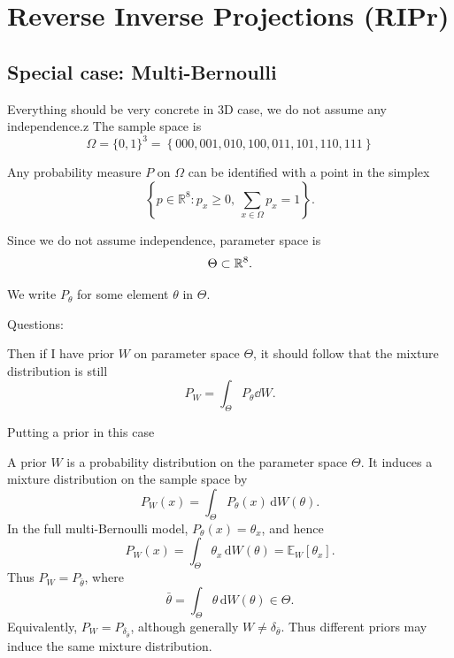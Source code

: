 \clearpage

\section{Reverse Inverse Projections (RIPr)}

\subsection{Special case: Multi-Bernoulli}

Everything should be very concrete in 3D case, we do not assume any independence.z
The sample space is
\begin{equation}
  \Omega = \{0,1\}^3 = \left\{000,001,010,100,011,101,110,111\right\}
\end{equation}

Any probability measure $P$ on $\Omega$ can be identified with a point in the simplex
\begin{equation}
\left\{
p\in\mathbb R^8:
p_x\ge 0,\ \sum_{x\in\Omega} p_x=1
\right\}.
\end{equation}

Since we do not assume independence, parameter space is 
\begin{equation}
  \Theta\subset\Rf^8.
\end{equation}

We write $P_\theta$ for some element $\theta$ in $\Theta$.

Questions:

Then if I have prior $W$ on parameter space $\Theta$,
it should follow that the mixture distribution is still 
\begin{equation}
  P_{W} = \int_{\Theta} P_{\theta} \dd{W}.
\end{equation}

Putting a prior in this case

A prior $W$ is a probability distribution on the parameter space $\Theta$.
It induces a mixture distribution on the sample space by
\[
P_W(x)
=
\int_\Theta P_\theta(x)\,\mathrm d W(\theta).
\]
In the full multi-Bernoulli model, $P_\theta(x)=\theta_x$, and hence
\[
P_W(x)
=
\int_\Theta \theta_x\,\mathrm d W(\theta)
=
\mathbb E_W[\theta_x].
\]
Thus $P_W=P_{\bar\theta}$, where
\[
\bar\theta=\int_\Theta \theta\,\mathrm d W(\theta)\in\Theta.
\]
Equivalently, $P_W=P_{\delta_{\bar\theta}}$, although generally
$W\neq \delta_{\bar\theta}$. Thus different priors may induce the same
mixture distribution.

